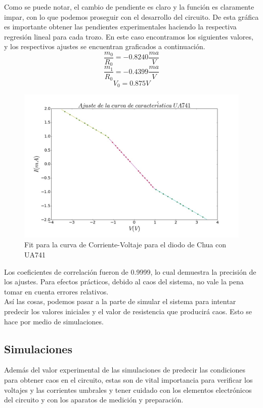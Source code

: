\documentclass[%
 reprint,
 amsmath,amssymb,
 aps,
]{revtex4-1}
\begin{document}
Como se puede notar, el cambio de pendiente es claro y la función es claramente impar, con lo que podemos proseguir con el desarrollo del circuito. De esta gráfica es importante obtener las pendientes experimentales haciendo la respectiva regresión lineal para cada trozo. En este caso encontramos los siguientes valores, y los respectivos ajustes se encuentran graficados a continuación.\\

\begin{equation}
\frac{m_0}{R_0} = -0.8240\frac{ma}{V}
\end{equation}
\begin{equation}
\frac{m_1}{R_0} = -0.4399\frac{ma}{V}
\end{equation}
\begin{equation}
V_0 = 0.875V
\end{equation}

\begin{figure}
\centering
\includegraphics[width=0.7\linewidth]{"fit"}
\caption{Fit para la curva de Corriente-Voltaje para el diodo de Chua con UA741}
\label{fig:fit}
\end{figure}

Los coeficientes de correlación fueron de 0.9999, lo cual demuestra la precisión de los ajustes. Para efectos prácticos, debido al caos del sistema, no vale la pena tomar en cuenta errores relativos.\\

Así las cosas, podemos pasar a la parte de simular el sistema para intentar predecir los valores iniciales y el valor de resistencia que producirá caos. Esto se hace por medio de simulaciones.\\

\subsection{\label{sec:level2}Simulaciones}
Además del valor experimental de las simulaciones de predecir las condiciones para obtener caos en el circuito, estas son de vital importancia para verificar los voltajes y las corrientes umbrales y tener cuidado con los elementos electrónicos del circuito y con los aparatos de medición y preparación.\\
\end{document}

